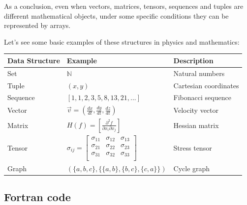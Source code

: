 As a conclusion, even when vectors, matrices, tensors, sequences and tuples are different mathematical objects, 
under some specific conditions they can be represented by arrays.

Let's see some basic examples of these structures in physics and mathematics:
\vspace{0.5cm}
\begin{table}[!h]
    \centering
    \begin{tabular}{|l|l|l|}
        \hline
        \textbf{Data Structure}  & \textbf{Example}  & \textbf{Description}  \\ \hline
        Set  & $\mathbb{N}$ & Natural numbers \\ \hline
        Tuple  & $(x,y)$ & Cartesian coordinates \\ \hline
        Sequence  & $[1,1,2,3,5,8,13,21,...]$ & Fibonacci sequence \\ \hline
        Vector  & $\vec{v} = (\frac{dx}{dt},\frac{dy}{dt},\frac{dz}{dt})$ & Velocity vector \\ \hline
        Matrix  & $H(f) = \left[ \frac{\partial^2f}{\partial x_i\partial x_j} \right]$  &   Hessian matrix   \\ \hline
        Tensor & $\sigma_{ij} = \left[{\begin{matrix}
                \sigma _{11} & \sigma _{12} & \sigma _{13} \\
                \sigma _{21} & \sigma _{22} & \sigma _{23} \\
                \sigma _{31} & \sigma _{32} & \sigma _{33} \\
        \end{matrix}}\right]$ & Stress tensor \\ \hline
        Graph  & $(\{a,b,c\}, \{\{a,b\},\{b,c\},\{c,a\}\})$ & Cycle graph  \\ \hline
    \end{tabular}
\end{table}












        \newpage
        \subsection*{Fortran code}
        
